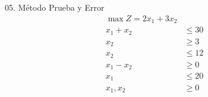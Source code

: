 \begin{frameExample}{05. Método Prueba y Error}{}
  \begin{align*}
    \max Z = 2x_1 + 3x_2 & \\[5mm]
    x_1 + x_2 & \leq 30\\
    x_2 & \geq 3\\
    x_2 & \leq 12\\
    x_1 - x_2 & \geq 0\\
    x_1  & \leq 20 \\[5mm]
    x_1, x_2 & \geq 0
  \end{align*}
\end{frameExample}


